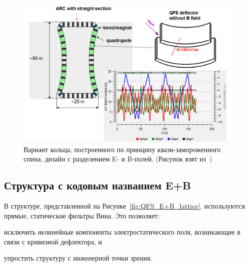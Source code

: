 \begin{figure}[h!]
	\centering
	\includegraphics[width=\linewidth]{images/chapter2/6_3_lattice}
	\caption{Вариант кольца, построенного по принципу квази-замороженного спина, дизайн с разделением E- и B-полей. (Рисунок взят из~\cite{Senichev:Lattices})\label{fig:QFS_6_3_lattice}}
\end{figure}

\subsection{Структура с кодовым названием E+B}\label{chpt2:lattice:QFS:EB}

В структуре, представленной на Рисунке~\ref{fig:QFS_E+B_lattice}, используются прямые, статические фильтры Вина. Это позволяет:
\begin{enumerate*}
	\item исключить нелинейные компоненты электростатического поля, возникающие в связи с кривизной дефлектора, и 
	\item упростить структуру с инженерной точки зрения.
\end{enumerate*}

